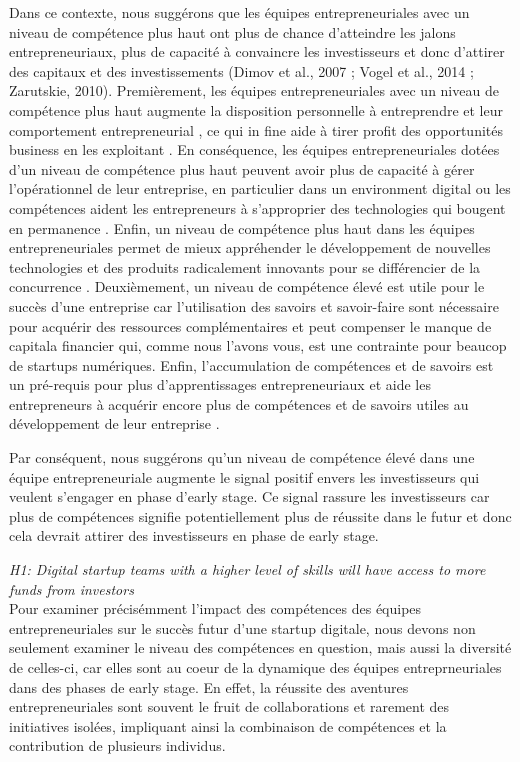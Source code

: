 \documentclass[12pt]{article}
\begin{document}
Dans ce contexte, nous suggérons que les équipes entrepreneuriales avec un niveau de compétence plus haut ont plus de chance d'atteindre les jalons entrepreneuriaux, plus de capacité à convaincre les investisseurs et donc d'attirer des capitaux et des investissements (Dimov et al., 2007 ; Vogel et al., 2014 ; Zarutskie, 2010). Premièrement, les équipes entrepreneuriales avec un niveau de compétence plus haut augmente la disposition personnelle à entreprendre et leur comportement entrepreneurial \citep{becherer1999proactive}, ce qui in fine aide à tirer profit des opportunités business en les exploitant \citep{shane2000promise, chandler1994founder}. En conséquence, les équipes entrepreneuriales dotées d'un niveau de compétence plus haut peuvent avoir plus de capacité à gérer l'opérationnel de leur entreprise, en particulier dans un environment digital ou les compétences aident les entrepreneurs à s'approprier des technologies qui bougent en permanence \citep{nambisan2017digital}. Enfin, un niveau de compétence plus haut dans les équipes entrepreneuriales permet de mieux appréhender le développement de nouvelles technologies et des produits radicalement innovants pour se différencier de la concurrence \citep{marvel2007technology}. Deuxièmement, un niveau de compétence élevé est utile pour le succès d'une entreprise car l'utilisation des savoirs et savoir-faire sont nécessaire pour acquérir des ressources complémentaires et peut compenser le manque de capitala financier qui, comme nous l'avons vous, est une contrainte pour beaucop de startups numériques. Enfin, l'accumulation de compétences et de savoirs est un pré-requis pour plus d'apprentissages entrepreneuriaux et aide les entrepreneurs à acquérir encore plus de compétences et de savoirs utiles au développement de leur entreprise \citep{hunter1986cognitive}.

Par conséquent, nous suggérons qu'un niveau de compétence élevé dans une équipe entrepreneuriale augmente le signal positif envers les investisseurs qui veulent s'engager en phase d'early stage. Ce signal rassure les investisseurs car plus de compétences signifie potentiellement plus de réussite dans le futur et donc cela devrait attirer des investisseurs en phase de early stage.

\noindent \textit{H1: Digital startup teams with a higher level of skills will have access to more funds from investors} \\

Pour examiner précisémment l'impact des compétences des équipes entrepreneuriales sur le succès futur d'une startup digitale, nous devons non seulement examiner le niveau des compétences en question, mais aussi la diversité de celles-ci, car elles sont au coeur de la dynamique des équipes entreprneuriales dans des phases de early stage. En effet, la réussite des aventures entrepreneuriales sont souvent le fruit de collaborations et rarement des initiatives isolées, impliquant ainsi la combinaison de compétences et la contribution de plusieurs individus.
\end{document}
